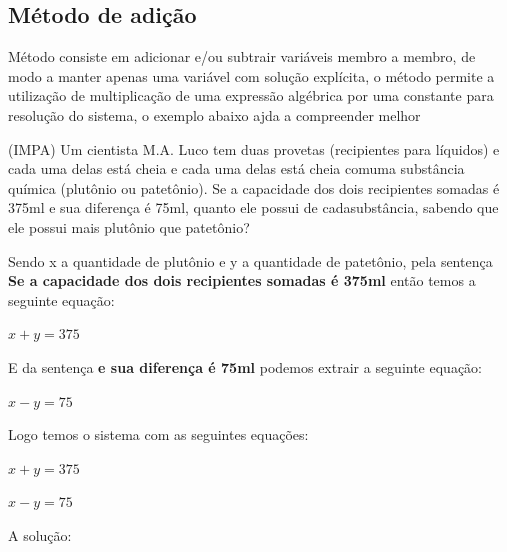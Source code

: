\begin{multicols*}{2}
    \subsection{Método de adição}
    Método consiste em adicionar e/ou subtrair variáveis membro a membro, de modo a manter apenas 			uma variável com solução explícita, o método permite a utilização de multiplicação de uma 				expressão algébrica por uma constante para resolução do sistema, o exemplo abaixo ajda a 				compreender melhor

    (IMPA) Um cientista M.A. Luco tem duas provetas (recipientes para líquidos) e cada uma delas 			está cheia e cada uma delas está cheia comuma substância química (plutônio ou patetônio). Se a 			capacidade dos dois recipientes somadas é 375ml e sua diferença é 75ml, quanto ele possui de 			cadasubstância, sabendo que ele possui mais plutônio que patetônio?

    Sendo x a quantidade de plutônio e y a quantidade de patetônio, pela sentença \textbf{ Se a 			capacidade dos dois recipientes somadas é 375ml} então temos a seguinte equação:

    $x + y = 375 $

    E da sentença \textbf{e sua diferença é 75ml} podemos extrair a seguinte equação:

    $x - y = 75$

    Logo temos o sistema com as seguintes equações:

    $x + y = 375 $

    $x - y = 75$

    A solução:




\end{multicols*}
